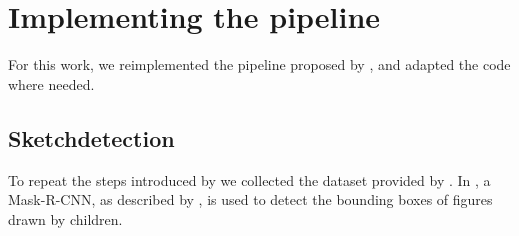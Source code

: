 \section*{Implementing the pipeline}
For this work, we reimplemented the pipeline proposed by
\textcite{korpitsch-2023-sao}, and adapted the code where needed.

\subsection*{Sketchdetection}
To repeat the steps introduced by \textcite{korpitsch-2023-sao} we collected the
dataset provided by \textcite{sarvadevabhatla2017sketchparse}. In
\textcite{smith2023method}, a Mask-R-CNN, as described by \textcite{he2018mask},
is used to detect the bounding boxes of figures drawn by children. 